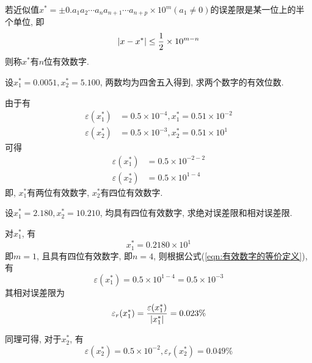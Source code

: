 \begin{definition}
    若近似值$x^*=\pm0.a_1a_2\cdots a_na_{n+1}\cdots a_{n+p}\times10^m(a_1\ne0)$的误差限是某一位上的半个单位, 即
    \begin{equation}\label{eqn:有效数字的等价定义}
        \abs{x-x^*}\le\frac{1}{2}\times10^{m-n}
    \end{equation}
    则称$x^*$有$n$位有效数字.
\end{definition}

\begin{example}
    设$x_1^*=0.0051, x_2^*=5.100$, 两数均为四舍五入得到, 求两个数字的有效位数.
\end{example}
\begin{solution}
    由于有
    \begin{align*}
        \varepsilon(x_1^*)&=0.5\times10^{-4}, x_1^*=0.51\times10^{-2}\\
        \varepsilon(x_2^*)&=0.5\times10^{-3}, x_2^*=0.51\times10^1
    \end{align*}
    可得
    \begin{align*}
        \varepsilon(x_1^*)&=0.5\times10^{-2-2}\\
        \varepsilon(x_2^*)&=0.5\times10^{1-4}
    \end{align*}
    即, $x_1^*$有两位有效数字, $x_2^*$有四位有效数字.
\end{solution}

\begin{example}
    设$x_1^*=2.180, x_2^*=10.210$, 均具有四位有效数字, 求绝对误差限和相对误差限.
\end{example}

\begin{solution}
    对$x_1^*$, 有
    \begin{equation*}
        x_1^*=0.2180\times10^1
    \end{equation*}
    即$m=1$, 且具有四位有效数字, 即$n=4$, 则根据公式(\ref{eqn:有效数字的等价定义}), 有
    \begin{equation*}
        \varepsilon(x_1^*)=0.5\times10^{1-4}=0.5\times10^{-3}
    \end{equation*}
    其相对误差限为
    \begin{equation*}
        \varepsilon_r(x_1^*)=\frac{\varepsilon(x_1^*)}{\abs{x_1^*}}=0.023\%
    \end{equation*}

    同理可得, 对于$x_2^*$, 有
    \begin{equation*}
        \varepsilon(x_2^*)=0.5\times10^{-2}, \varepsilon_r(x_2^*)=0.049\%
    \end{equation*}
\end{solution}

